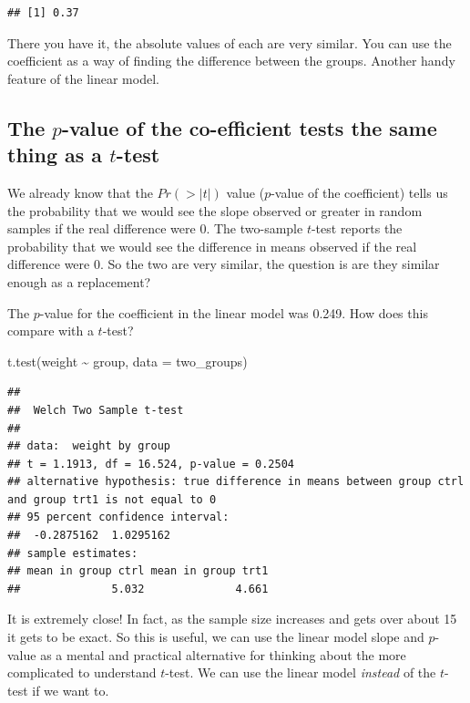 \documentclass[
]{book}
\newenvironment{Shaded}{\begin{snugshade}}{\end{snugshade}}
\newcommand{\AttributeTok}[1]{\textcolor[rgb]{0.77,0.63,0.00}{#1}}
\newcommand{\FunctionTok}[1]{\textcolor[rgb]{0.00,0.00,0.00}{#1}}
\newcommand{\NormalTok}[1]{#1}
\newcommand{\SpecialCharTok}[1]{\textcolor[rgb]{0.00,0.00,0.00}{#1}}
\begin{document}
\begin{verbatim}
## [1] 0.37
\end{verbatim}

There you have it, the absolute values of each are very similar. You can use the coefficient as a way of finding the difference between the groups. Another handy feature of the linear model.

\hypertarget{the-p-value-of-the-co-efficient-tests-the-same-thing-as-a-t-test}{%
\subsection{\texorpdfstring{The \(p\)-value of the co-efficient tests the same thing as a \(t\)-test}{The p-value of the co-efficient tests the same thing as a t-test}}\label{the-p-value-of-the-co-efficient-tests-the-same-thing-as-a-t-test}}

We already know that the \(Pr(>|t|)\) value (\(p\)-value of the coefficient) tells us the probability that we would see the slope observed or greater in random samples if the real difference were 0. The two-sample \(t\)-test reports the probability that we would see the difference in means observed if the real difference were 0. So the two are very similar, the question is are they similar enough as a replacement?

The \(p\)-value for the coefficient in the linear model was 0.249. How does this compare with a \(t\)-test?

\begin{Shaded}
\begin{Highlighting}[]
\FunctionTok{t.test}\NormalTok{(weight }\SpecialCharTok{\textasciitilde{}}\NormalTok{ group, }\AttributeTok{data =}\NormalTok{ two\_groups)}
\end{Highlighting}
\end{Shaded}

\begin{verbatim}
## 
## 	Welch Two Sample t-test
## 
## data:  weight by group
## t = 1.1913, df = 16.524, p-value = 0.2504
## alternative hypothesis: true difference in means between group ctrl and group trt1 is not equal to 0
## 95 percent confidence interval:
##  -0.2875162  1.0295162
## sample estimates:
## mean in group ctrl mean in group trt1 
##              5.032              4.661
\end{verbatim}

It is extremely close! In fact, as the sample size increases and gets over about 15 it gets to be exact. So this is useful, we can use the linear model slope and \(p\)-value as a mental and practical alternative for thinking about the more complicated to understand \(t\)-test. We can use the linear model \emph{instead} of the \(t\)-test if we want to.
\end{document}
